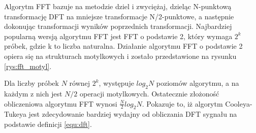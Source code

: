 Algorytm FFT bazuje na metodzie dziel i zwyciężaj, dzieląc N-punktową transformację DFT na mniejsze transformacje N/2-punktowe, a następnie dokonując transformacji wyników poprzednich transformacji. Najbardziej popularną wersją algorytmu FFT jest FFT o podstawie 2, który wymaga $2^{k}$ próbek, gdzie k to liczba naturalna. Działanie algorytmu FFT o podstawie 2 opiera się na strukturach motylkowych i zostało przedstawione na rysunku \ref{rys:fft_motyl}.

Dla liczby próbek $N$ równej $2^{k}$, występuje $log_{2}N$ poziomów algorytmu, a na każdym z nich jest $N/2$ operacji motylkowych. Ostatecznie złożoność obliczeniowa algorytmu FFT wynosi $\frac{N}{2}log_{2}N$. Pokazuje to, iż algorytm Cooleya-Tukeya jest zdecydowanie bardziej wydajny od obliczania DFT sygnału na podstawie definicji \ref{equ:dft}.
